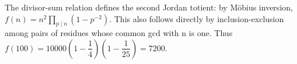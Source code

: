 The divisor-sum relation defines the second Jordan totient: by M\"obius inversion, $f(n)=n^2\prod_{p\mid n}(1-p^{-2})$. This also follows directly by inclusion-exclusion among pairs of residues whose common gcd with n is one. Thus $f(100)=10000(1-\dfrac{1}{4})(1-\dfrac{1}{25})=\boxed{7200}$.
